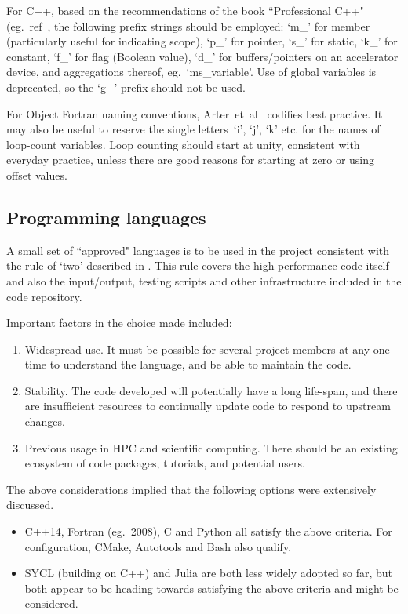 \begin{enumerate}
For C++, based on the recommendations of the book ``Professional C++" (eg.\
ref~\cite[\S\,7]{solterkleper}, the following prefix strings should be employed:
`m\_' for  member (particularly useful for indicating scope),
`p\_' for pointer, `s\_' for static, `k\_' for constant,
`f\_' for flag (Boolean value),
`d\_' for buffers/pointers on an accelerator device,
and aggregations thereof, eg.\ `ms\_variable'.
Use of global variables is deprecated, so the `g\_' prefix should not be used.

For Object Fortran naming conventions, Arter~et~al~\cite{fprog} codifies best practice.
It may also be useful to reserve the single letters~`i', `j', `k' etc. for the
names of loop-count variables. Loop counting should start at unity, consistent
with everyday practice, unless there are good reasons for starting at zero
or using offset values. %

\end{enumerate}

\subsection{Programming languages} \label{sec:lang}

A small set of ``approved" languages is to be used in the project
consistent with the rule of `two' described in \Sec{MGT_intro}.
This rule covers the high performance code itself and
also the input/output, testing scripts and other infrastructure included in
the code repository.

Important factors in the choice made included:
\begin{enumerate}
\item Widespread use. It must be possible for several project members at any one time
to understand the language, and be able to maintain the code.
\item Stability. The code developed will potentially have a long life-span, 
and there are insufficient resources to continually update code to respond to
upstream changes.
\item Previous usage in HPC and scientific computing. There should be an
existing ecosystem of code packages, tutorials, and potential users.
\end{enumerate}
The above considerations implied that the following options were extensively discussed.
\begin{itemize}
\item C++14, Fortran (eg.\ 2008), C and Python all satisfy the above criteria. 
For configuration, CMake, Autotools and Bash also qualify.
\item SYCL (building on C++) and Julia are both less widely adopted so
far, but both appear to be heading towards satisfying the above
criteria and  might be considered.
\end{itemize}

